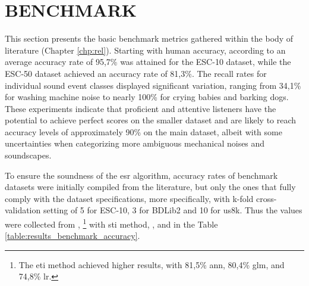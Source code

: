 \section{BENCHMARK}
\label{sec:results_metrics}


This section presents the basic benchmark metrics gathered within the body of literature (Chapter \ref{chp:rel}). Starting with human accuracy, according to \textcite{PiczakESC2015} an average accuracy rate of 95,7\% was attained for the ESC-10 dataset, while the ESC-50 dataset achieved an accuracy rate of 81,3\%. The recall rates for individual sound event classes displayed significant variation, ranging from 34,1\% for washing machine noise to nearly 100\% for crying babies and barking dogs. These experiments indicate that proficient and attentive listeners have the potential to achieve perfect scores on the smaller dataset and are likely to reach accuracy levels of approximately 90\% on the main dataset, albeit with some uncertainties when categorizing more ambiguous mechanical noises and soundscapes.

To ensure the soundness of the \gls{esr} algorithm, accuracy rates of benchmark datasets were initially compiled from the literature, but only the ones that fully comply with the dataset specifications, more specifically, with k-fold cross-validation setting of 5 for ESC-10, 3 for BDLib2 and 10 for \gls{us8k}. Thus the values were collected from \textcite{PiczakESC2015}, \textcite{Bountourakis2019}\footnote{The \gls{eti} method achieved higher results, with 81,5\% \gls{ann}, 80,4\% \gls{glm}, and 74,8\% \gls{lr}.} with \gls{sti} method,  \textcite{Salamon2014}, and \textcite{Vandendriessche2021} in the Table \ref{table:results_benchmark_accuracy}.

